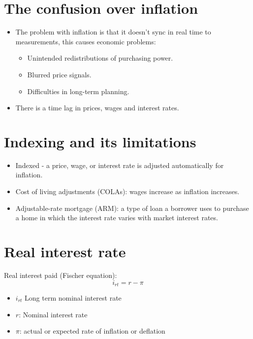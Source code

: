 \documentclass[openany]{book}
\begin{document}
\section{The confusion over inflation}
\begin{itemize}
    \item The problem with inflation is that it doesn't sync in real time to measurements, this causes economic problems:
    \begin{itemize}
            \item Unintended redistributions of purchasing power.
            \item Blurred price signals. 
            \item Difficulties in long-term planning.  
        \end{itemize}    
    \item There is a time lag in prices, wages and interest rates. 
\end{itemize}



\section{Indexing and its limitations}
\begin{itemize}
    \item Indexed - a price, wage, or interest rate is adjusted automatically for inflation.
    \item Cost of living adjustments (COLAs): wages increase as inflation increases. 
    \item Adjustable-rate mortgage (ARM): a type of loan a borrower uses to purchase a home in which the interest rate varies with market interest rates. 
\end{itemize}
\section{Real interest rate}
Real interest paid (Fischer equation): 
\[
  i_{rt} = r - \pi  
\]
\begin{itemize}
    \item $i_{rt}$ Long term nominal interest rate 
    \item $r$: Nominal interest rate 
    \item $\pi$: actual or expected rate of inflation or deflation
\end{itemize}
\end{document}

